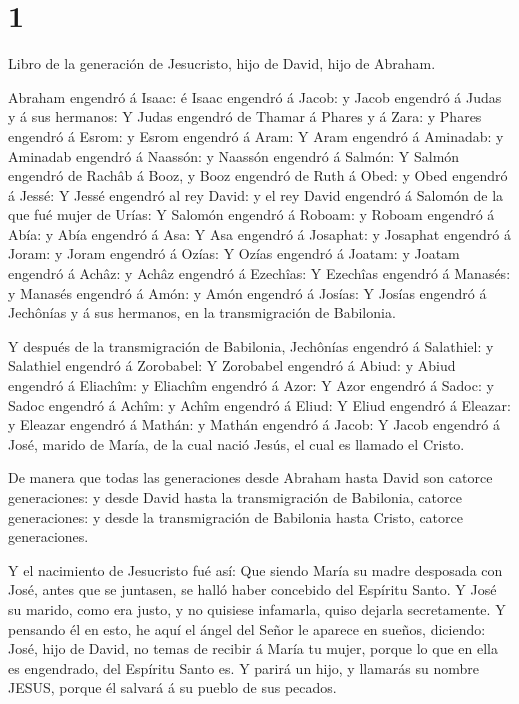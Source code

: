 \hypertarget{section}{%
\section{1}\label{section}}

 Libro de la generación de Jesucristo, hijo de David, hijo
de Abraham.

 Abraham engendró á Isaac: é Isaac engendró á Jacob: y Jacob
engendró á Judas y á sus hermanos:  Y Judas engendró de
Thamar á Phares y á Zara: y Phares engendró á Esrom: y Esrom engendró á
Aram:  Y Aram engendró á Aminadab: y Aminadab engendró á
Naassón: y Naassón engendró á Salmón:  Y Salmón engendró de
Rachâb á Booz, y Booz engendró de Ruth á Obed: y Obed engendró á Jessé:
 Y Jessé engendró al rey David: y el rey David engendró á
Salomón de la que fué mujer de Urías:  Y Salomón engendró á
Roboam: y Roboam engendró á Abía: y Abía engendró á Asa:  Y
Asa engendró á Josaphat: y Josaphat engendró á Joram: y Joram engendró á
Ozías:  Y Ozías engendró á Joatam: y Joatam engendró á
Achâz: y Achâz engendró á Ezechîas:  Y Ezechîas engendró á
Manasés: y Manasés engendró á Amón: y Amón engendró á Josías:
 Y Josías engendró á Jechônías y á sus hermanos, en la
transmigración de Babilonia.

 Y después de la transmigración de Babilonia, Jechônías
engendró á Salathiel: y Salathiel engendró á Zorobabel:  Y
Zorobabel engendró á Abiud: y Abiud engendró á Eliachîm: y Eliachîm
engendró á Azor:  Y Azor engendró á Sadoc: y Sadoc engendró
á Achîm: y Achîm engendró á Eliud:  Y Eliud engendró á
Eleazar: y Eleazar engendró á Mathán: y Mathán engendró á Jacob:
 Y Jacob engendró á José, marido de María, de la cual nació
Jesús, el cual es llamado el Cristo.

 De manera que todas las generaciones desde Abraham hasta
David son catorce generaciones: y desde David hasta la transmigración de
Babilonia, catorce generaciones: y desde la transmigración de Babilonia
hasta Cristo, catorce generaciones.

 Y el nacimiento de Jesucristo fué así: Que siendo María su
madre desposada con José, antes que se juntasen, se halló haber
concebido del Espíritu Santo.  Y José su marido, como era
justo, y no quisiese infamarla, quiso dejarla secretamente.
 Y pensando él en esto, he aquí el ángel del Señor le
aparece en sueños, diciendo: José, hijo de David, no temas de recibir á
María tu mujer, porque lo que en ella es engendrado, del Espíritu Santo
es.  Y parirá un hijo, y llamarás su nombre JESUS, porque
él salvará á su pueblo de sus pecados.


